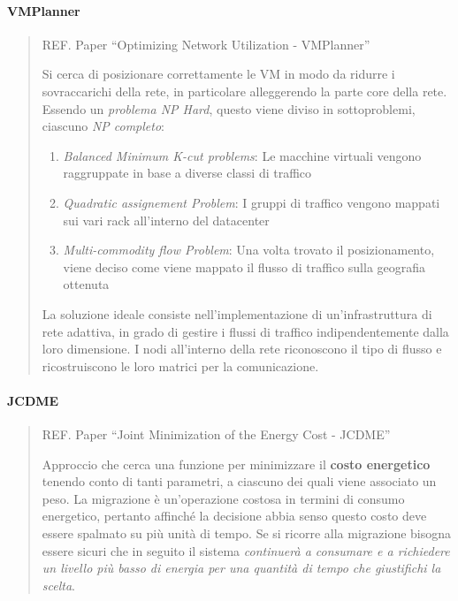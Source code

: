 \documentclass{article}
\providecommand{\tightlist}{%
		  \setlength{\itemsep}{0pt}\setlength{\parskip}{0pt}}
\begin{document}
		\paragraph{VMPlanner}
		\begin{quote}
		REF. Paper ``Optimizing Network Utilization -
		VMPlanner''
		
		Si cerca di posizionare correttamente le VM in modo da
		ridurre i sovraccarichi della rete, in particolare
		alleggerendo la parte core della rete. Essendo un \emph{problema
		NP Hard}, questo viene diviso in sottoproblemi, ciascuno \emph{NP
		completo}:
		
		\begin{enumerate}
		\def\labelenumi{\arabic{enumi}.}
		\tightlist
		\item
		  \textit{Balanced Minimum K-cut problems}: Le macchine virtuali vengono raggruppate in base a diverse classi di traffico
		\item
		  \textit{Quadratic assignement Problem}: I gruppi di traffico vengono mappati sui vari rack all’interno del datacenter
		\item
		  \textit{Multi-commodity flow Problem}: Una volta trovato il posizionamento, viene deciso come viene mappato il flusso di
		  traffico sulla geografia ottenuta
		\end{enumerate}
		
		La soluzione ideale consiste nell'implementazione di
		un'infrastruttura di rete adattiva, in grado di gestire
		i flussi di traffico indipendentemente dalla loro dimensione. I nodi
		all'interno della rete riconoscono il tipo di flusso e
		ricostruiscono le loro matrici per la comunicazione.
		\end{quote}
		
		\paragraph{JCDME}
		\begin{quote}
		REF. Paper ``Joint Minimization of the Energy Cost -
		JCDME''
		
		Approccio che cerca una funzione per minimizzare il \textbf{costo
		energetico} tenendo conto di tanti parametri, a
		ciascuno dei quali viene associato un peso. La
		migrazione è un'operazione costosa in termini
		di consumo energetico, pertanto affinché la decisione
		abbia senso questo costo deve essere spalmato su più unità
		di tempo. Se si ricorre alla migrazione bisogna essere sicuri che in
		seguito il sistema \emph{continuerà a consumare e a richiedere un
		livello più basso di energia per una quantità di tempo che giustifichi
		la scelta}.
		\end{quote}
		
\end{document}
